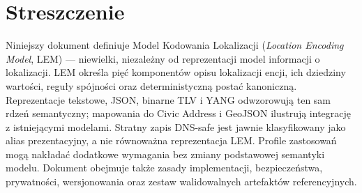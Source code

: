 \documentclass[polish,a4paper,oneside]{ppfcmthesis}
\begin{document}
\cleardoublepage
\hypersetup{pageanchor=true}


\thispagestyle{empty}
\section*{Streszczenie}
Niniejszy dokument definiuje Model Kodowania Lokalizacji (\textit{Location Encoding Model}, LEM) --- niewielki, niezależny od reprezentacji model informacji o lokalizacji. LEM określa pięć komponentów opisu lokalizacji encji, ich dziedziny wartości, reguły spójności oraz deterministyczną postać kanoniczną. Reprezentacje tekstowe, JSON, binarne TLV i YANG odwzorowują ten sam rdzeń semantyczny; mapowania do Civic Address i GeoJSON ilustrują integrację z istniejącymi modelami. Stratny zapis DNS-safe jest jawnie klasyfikowany jako alias prezentacyjny, a nie równoważna reprezentacja LEM. Profile zastosowań mogą nakładać dodatkowe wymagania bez zmiany podstawowej semantyki modelu. Dokument obejmuje także zasady implementacji, bezpieczeństwa, prywatności, wersjonowania oraz zestaw walidowalnych artefaktów referencyjnych.
\vfill\cleardoublepage
\end{document}
